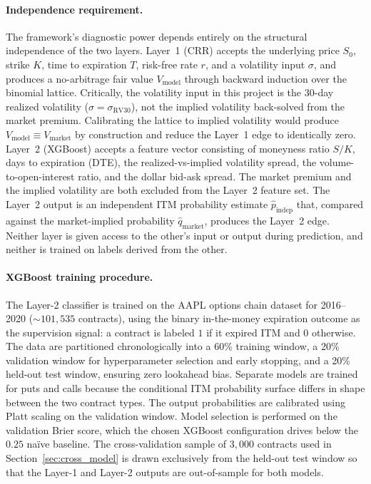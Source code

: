 \documentclass[12pt, letterpaper]{article}
\begin{document}
\paragraph{Independence requirement.} The framework's diagnostic
power depends entirely on the structural independence of the two
layers. Layer~1 (CRR) accepts the underlying price $S_{0}$, strike
$K$, time to expiration $T$, risk-free rate $r$, and a volatility
input $\sigma$, and produces a no-arbitrage fair value
$V_{\text{model}}$ through backward induction over the binomial
lattice. Critically, the volatility input in this project is the
30-day realized volatility ($\sigma = \sigma_{\text{RV30}}$), not the
implied volatility back-solved from the market premium. Calibrating
the lattice to implied volatility would produce $V_{\text{model}}
\equiv V_{\text{market}}$ by construction and reduce the Layer~1 edge
to identically zero. Layer~2 (XGBoost) accepts a feature vector
consisting of moneyness ratio $S/K$, days to expiration (DTE), the
realized-vs-implied volatility spread, the volume-to-open-interest
ratio, and the dollar bid-ask spread. The market premium and the
implied volatility are both excluded from the Layer~2 feature set.
The Layer~2 output is an independent ITM probability estimate
$\hat{p}_{\text{indep}}$ that, compared against the market-implied
probability $\hat{q}_{\text{market}}$, produces the Layer~2 edge.
Neither layer is given access to the other's input or output during
prediction, and neither is trained on labels derived from the other.

\paragraph{XGBoost training procedure.} The Layer-2 classifier is
trained on the AAPL options chain dataset for 2016--2020
($\sim 101{,}535$ contracts), using the binary in-the-money expiration
outcome as the supervision signal: a contract is labeled $1$ if it
expired ITM and $0$ otherwise. The data are partitioned chronologically
into a 60\% training window, a 20\% validation window for
hyperparameter selection and early stopping, and a 20\% held-out
test window, ensuring zero lookahead bias. Separate models are trained
for puts and calls because the conditional ITM probability surface
differs in shape between the two contract types. The output
probabilities are calibrated using Platt scaling on the validation
window. Model selection is performed on the validation Brier score,
which the chosen XGBoost configuration drives below the $0.25$ naïve
baseline. The cross-validation sample of $3{,}000$ contracts used in
Section~\ref{sec:cross_model} is drawn exclusively from the held-out
test window so that the Layer-1 and Layer-2 outputs are out-of-sample
for both models.
\end{document}
